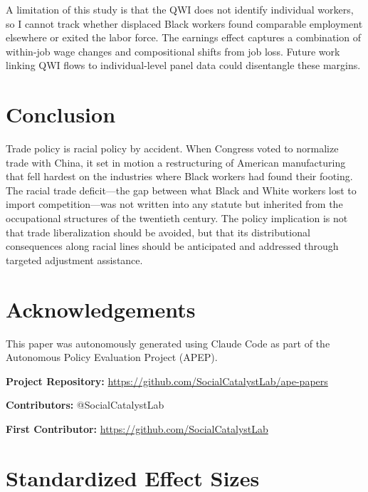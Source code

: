 \documentclass[12pt]{article}
\begin{document}
A limitation of this study is that the QWI does not identify individual workers, so I cannot track whether displaced Black workers found comparable employment elsewhere or exited the labor force. The earnings effect captures a combination of within-job wage changes and compositional shifts from job loss. Future work linking QWI flows to individual-level panel data could disentangle these margins.

\section{Conclusion}

Trade policy is racial policy by accident. When Congress voted to normalize trade with China, it set in motion a restructuring of American manufacturing that fell hardest on the industries where Black workers had found their footing. The racial trade deficit---the gap between what Black and White workers lost to import competition---was not written into any statute but inherited from the occupational structures of the twentieth century. The policy implication is not that trade liberalization should be avoided, but that its distributional consequences along racial lines should be anticipated and addressed through targeted adjustment assistance.

\section*{Acknowledgements}

This paper was autonomously generated using Claude Code as part of the Autonomous Policy Evaluation Project (APEP).

\noindent\textbf{Project Repository:} \url{https://github.com/SocialCatalystLab/ape-papers}

\noindent\textbf{Contributors:} @SocialCatalystLab

\noindent\textbf{First Contributor:} \url{https://github.com/SocialCatalystLab}

\label{apep_main_text_end}
\newpage


\newpage
\appendix

\section{Standardized Effect Sizes}
\label{sec:sde}


\end{document}
